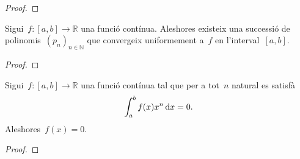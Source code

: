 \documentclass[../analisi-matematica.tex]{subfiles}
\begin{document}
    \begin{proof}
    \end{proof}
    \begin{theorem}
        \label{thm:Teorema-daproximacio-polinomica-de-Weierstrass}
        Sigui~\(f\colon[a,b]\longrightarrow\mathbb{R}\) una funció contínua.
        Aleshores existeix una successió de polinomis~\((p_{n})_{n\in\mathbb{N}}\) que convergeix uniformement a~\(f\) en l'interval~\([a,b]\).
    \end{theorem}
    \begin{proof}
    \end{proof}
    \begin{corollary}
        Sigui~\(f\colon[a,b]\longrightarrow\mathbb{R}\) una funció contínua tal que per a tot~\(n\) natural es satisfà
        \[
            \int_{a}^{b}f(x)x^{n}\mathop{}\!\mathrm{d} x=0.
        \]
        Aleshores~\(f(x)=0\).
    \end{corollary}
    \begin{proof}
    \end{proof}
\end{document}
